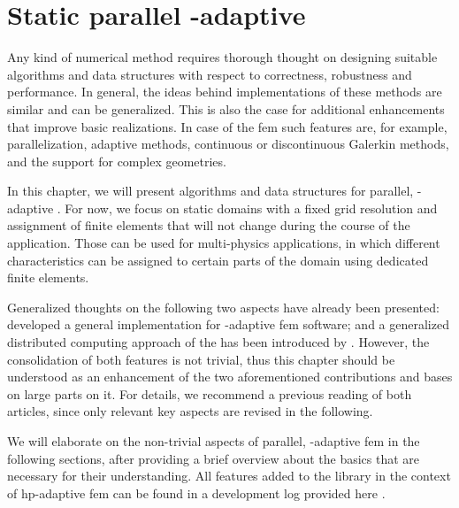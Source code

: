 \chapter{Static parallel \hp-adaptive }
\label{ch:parallel}
\glsresetall

Any kind of numerical method requires thorough thought on designing suitable algorithms and data structures with respect to correctness, robustness and performance. In general, the ideas behind implementations of these methods are similar and can be generalized.
This is also the case for additional enhancements that improve basic realizations. In case of the \gls{fem} such features are, for example, parallelization, adaptive methods, continuous or discontinuous Galerkin methods, and the support for complex geometries.

In this chapter, we will present algorithms and data structures for parallel, \hp-adaptive . For now, we focus on static domains with a fixed grid resolution and assignment of finite elements that will not change during the course of the application. Those can be used for multi-physics applications, in which different characteristics can be assigned to certain parts of the domain using dedicated finite elements.

Generalized thoughts on the following two aspects have already been presented: \textcite{bangerth2009} developed a general implementation for \hp-adaptive \gls{fem} software; and a generalized distributed computing approach of the  has been introduced by \textcite{bangerth2012}. However, the consolidation of both features is not trivial, thus this chapter should be understood as an enhancement of the two aforementioned contributions and bases on large parts on it. For details, we recommend a previous reading of both articles, since only relevant key aspects are revised in the following.

We will elaborate on the non-trivial aspects of parallel, \hp-adaptive \gls{fem} in the following sections, after providing a brief overview about the basics that are necessary for their understanding. All features added to the \dealii{} library in the context of hp-adaptive \gls{fem} can be found in a development log provided here \textcite{dealiiissue3511}.





